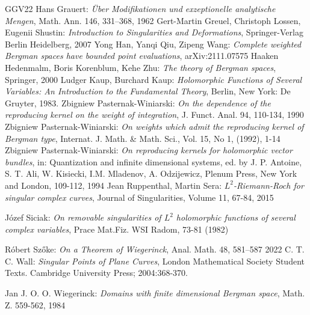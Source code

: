 \documentclass[11pt]{amsart}
\theoremstyle{definition}
\begin{document}
\begin{thebibliography}{GGV22}
Hans Grauert:  
\emph{Über Modifikationen und exzeptionelle analytische Mengen}, Math. Ann. 146, 331–368, 1962
Gert-Martin Greuel, Christoph Lossen, Eugenii Shustin: \emph{Introduction to Singularities and Deformations}, Springer-Verlag Berlin Heidelberg, 2007
Yong Han, Yanqi Qiu, Zipeng Wang:
\emph{Complete weighted Bergman spaces have bounded point evaluations},
arXiv:2111.07575
Haaken Hedenmalm, Boris Korenblum, Kehe Zhu:
\emph{The theory of Bergman spaces}, Springer, 2000
Ludger Kaup,  Burchard Kaup:  \emph{Holomorphic Functions of Several Variables: An Introduction to the Fundamental Theory},
 Berlin, New York: De Gruyter, 1983.
Zbigniew Pasternak-Winiarski: 
\emph{On the dependence of the reproducing kernel on the weight of integration},
J.  Funct. Anal. 94, 110-134, 1990
Zbigniew Pasternak-Winiarski:
\emph{On weights which admit the reproducing kernel of Bergman type},
Internat. J. Math. \& Math. Sci., Vol. 15, No 1, (1992), 1-14
Zbigniew Pasternak-Winiarski: 
\emph{On reproducing kernels for holomorphic vector bundles},
in: Quantization and infinite dimensional systems, ed. by J. P. Antoine, S. T. Ali, W. Kisiecki, I.M. Mladenov, A. Odzijewicz,
Plenum Press, New York and London, 109-112, 1994
Jean Ruppenthal,  Martin  Sera: 
\emph{$L^2$-Riemann-Roch for singular complex curves},
Journal of Singularities, Volume 11,  67-84, 2015

Józef Siciak:
\emph{On removable singularities of $L^2$ holomorphic functions of several complex variables},
Prace Mat.Fiz. WSI Radom, 73-81 (1982)

Róbert Szőke:  
\emph{On a Theorem of Wiegerinck},
Anal. Math. 48, 581–587 2022
 C. T. C. Wall: \emph{Singular Points of Plane Curves}, London Mathematical Society Student Texts. Cambridge University Press; 2004:368-370.

Jan J. O. O. Wiegerinck:  
\emph{Domains with finite dimensional Bergman space},
Math. Z. 559-562, 1984















\end{thebibliography}
\end{document}
